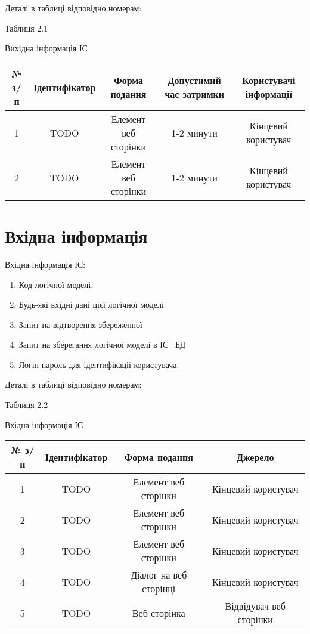 \newpage

Деталі в таблиці відповідно номерам:

\begin{flushright}\small {Таблиця 2.1} \end{flushright}
\begin{center}
Вихідна інформація ІС
\small{
\begin{tabular}{ | c | c | c | c | c | }
\hline
 № з/п  & Ідентифікатор & Форма подання & Допустимий час затримки & Користувачі інформації \\ 
\hline
 1 & TODO & Елемент веб сторінки & 1-2 минути & Кінцевий користувач \\  
\hline
 2 & TODO & Елемент веб сторінки & 1-2 минути & Кінцевий користувач \\  
\hline
\end{tabular}
}
\end{center}


\section{Вхідна інформація}

Вхідна інформація ІС: 

\begin{enumerate}
	\item Код логічної моделі.
	\item Будь-які вхідні дані цієї логічної моделі
	\item Запит на відтворення збереженної 
	\item Запит на зберегання логічної моделі в ІС \ БД
	\item Логін-пароль для ідентифікації користувача.
\end{enumerate}

Деталі в таблиці відповідно номерам:

\begin{flushright}\small {Таблиця 2.2} \end{flushright}
\begin{center}
Вхідна інформація ІС
\small{
\begin{tabular}{ | c | c | c | c |  }
\hline
 № з/п  & Ідентифікатор & Форма подання & Джерело \\ 
\hline
 1 & TODO & Елемент веб сторінки & Кінцевий користувач \\  
\hline
 2 & TODO & Елемент веб сторінки & Кінцевий користувач \\  
\hline
 3 & TODO & Елемент веб сторінки & Кінцевий користувач \\  
\hline
 4 & TODO & Діалог на веб сторінці & Кінцевий користувач \\  
\hline
 5 & TODO & Веб сторінка & Відвідувач веб сторінки \\  
\hline
\end{tabular}
}
\end{center}


